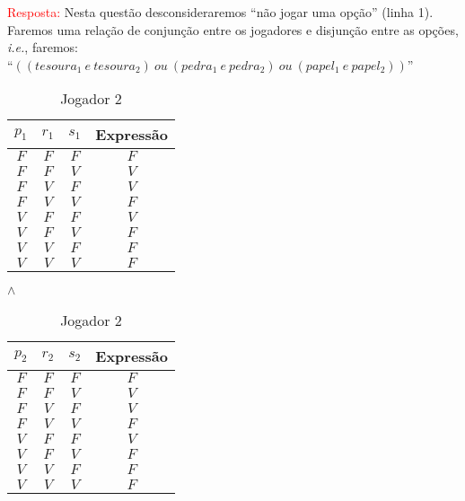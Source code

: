 \documentclass[a4paper,12pt]{article}
\begin{document}
\begin{enumerate}
\begin{enumerate}
\textcolor{red}{Resposta:} Nesta questão desconsideraremos ``não jogar uma opção'' (linha 1). Faremos uma relação de conjunção entre os jogadores e disjunção entre as opções, {\it i.e.}, faremos: \\
``$((tesoura_1 ~e ~tesoura_2) ~ou ~(pedra_1 ~e ~pedra_2) ~ou ~(papel_1 ~e ~papel_2))$''
\begin{table}[htb]
\begin{center}
\begin{minipage}[htb]{0.4\linewidth}
\centering
 \begin{tabular}{|c|c|c|c|}
  \hline	
  \rowcolor[rgb]{0.9,0.9,0.9} { $p_1$} & { $r_1$} & { $s_1$} & {\bf Expressão} \\ \hline
   $F$   & $F$   & $F$   & $F$ \\ \hline
  \rowcolor[rgb]{1,0.2,0.2} $F$   & $F$   & $V$   & $V$ \\ \hline
  \rowcolor[rgb]{1,0.2,0.2} $F$   & $V$   & $F$   & $V$ \\ \hline
   $F$   & $V$   & $V$   & $F$ \\ \hline
  \rowcolor[rgb]{1,0.2,0.2} $V$   & $F$   & $F$   & $V$ \\ \hline
   $V$   & $F$   & $V$   & $F$ \\ \hline
   $V$   & $V$   & $F$   & $F$ \\ \hline
   $V$   & $V$   & $V$   & $F$ \\ \hline
\end{tabular}
\caption{Jogador 1}
\label{4d1}
\end{minipage}
$\wedge$
\begin{minipage}[htb]{0.4\linewidth}
\centering
 \begin{tabular}{|c|c|c|c|}
  \hline	
  \rowcolor[rgb]{0.9,0.9,0.9} { $p_2$} & { $r_2$} & { $s_2$} & {\bf Expressão} \\ \hline
   $F$   & $F$   & $F$   & $F$ \\ \hline
  \rowcolor[rgb]{1,0.2,0.2} $F$   & $F$   & $V$   & $V$ \\ \hline
  \rowcolor[rgb]{1,0.2,0.2} $F$   & $V$   & $F$   & $V$ \\ \hline
   $F$   & $V$   & $V$   & $F$ \\ \hline
  \rowcolor[rgb]{1,0.2,0.2} $V$   & $F$   & $F$   & $V$ \\ \hline
   $V$   & $F$   & $V$   & $F$ \\ \hline
   $V$   & $V$   & $F$   & $F$ \\ \hline
   $V$   & $V$   & $V$   & $F$ \\ \hline
\end{tabular}
\caption{Jogador 2}
\label{4d2}
\end{minipage}
\end{center}
\end{table}
 

\end{enumerate}
\end{enumerate}
\end{document}
